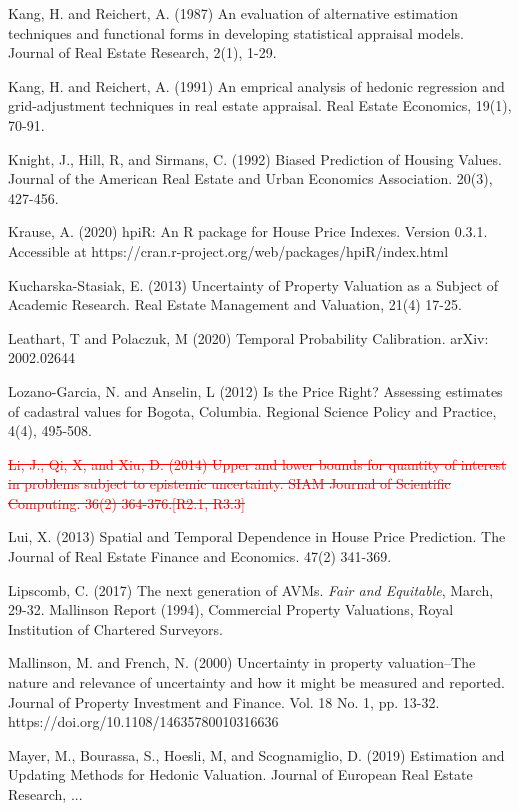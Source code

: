 \documentclass[colTwo]{anon}
\theoremstyle{definition}
\begin{document}
\begin{thebibliography}{50}
\harvarditem{}{}{}Kang, H. and Reichert, A. (1987) An evaluation of alternative estimation techniques and functional forms in developing statistical appraisal models. Journal of Real Estate Research, 2(1), 1-29. 

\harvarditem{}{}{}Kang, H. and Reichert, A. (1991) An emprical analysis of hedonic regression and grid-adjustment techniques in real estate appraisal. Real Estate Economics, 19(1), 70-91. 

\harvarditem{}{}{}Knight, J., Hill, R, and Sirmans, C. (1992) Biased Prediction of Housing Values. Journal of the American Real Estate and Urban Economics Association. 20(3), 427-456. 

\harvarditem{}{}{}Krause, A. (2020) hpiR: An R package for House Price Indexes.  Version 0.3.1.  Accessible at https://cran.r-project.org/web/packages/hpiR/index.html

\harvarditem{}{}{}Kucharska-Stasiak, E. (2013) Uncertainty of Property Valuation as a Subject of Academic Research. Real Estate Management and Valuation, 21(4) 17-25.

\harvarditem{}{}{}Leathart, T and Polaczuk, M  (2020) Temporal Probability Calibration. arXiv: 2002.02644

\harvarditem{}{}{}Lozano-Garcia, N. and Anselin, L (2012) Is the Price Right?  Assessing estimates of cadastral values for Bogota, Columbia. Regional Science Policy and Practice, 4(4), 495-508.

\harvarditem{}{}{}\textcolor{red}{\st{Li, J., Qi, X, and Xiu, D. (2014) Upper and lower bounds for quantity of interest in problems subject to epistemic uncertainty. SIAM Journal of Scientific Computing. 36(2) 364-376.[R2.1, R3.3]}}

\harvarditem{}{}{}Lui, X. (2013) Spatial and Temporal Dependence in House Price Prediction. The Journal of Real Estate Finance and Economics. 47(2) 341-369. 
 
\harvarditem{}{}{}Lipscomb, C. (2017) The next generation of AVMs. \textit{Fair and Equitable}, March, 29-32.  
\harvarditem{}{}{}Mallinson Report (1994), Commercial Property Valuations, Royal Institution of Chartered Surveyors.

\harvarditem{}{}{}Mallinson, M. and French, N. (2000) Uncertainty in property valuation--The nature and relevance of uncertainty and how it might be measured and reported. Journal of Property Investment and Finance. Vol. 18 No. 1, pp. 13-32. https://doi.org/10.1108/14635780010316636

\harvarditem{}{}{}Mayer, M., Bourassa, S., Hoesli, M, and Scognamiglio, D. (2019) Estimation and Updating Methods for Hedonic Valuation. Journal of European Real Estate Research, ...


\end{thebibliography}
\end{document}

